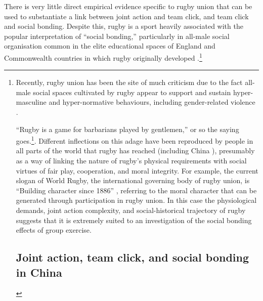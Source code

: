 There is very little direct empirical evidence specific to rugby union that can be used to substantiate a link between joint action and team click, and team click and social bonding.  Despite this, rugby is a sport heavily associated with the popular interpretation of ``social bonding,'' particularly in all-male social organisation common in the elite educational spaces of England and Commonwealth countries in which rugby originally developed \citep{Dunning2005,Richards2007,Collins2008}.\footnote{Recently, rugby union has been the site of much criticism due to the fact all-male social spaces cultivated by rugby appear to support and sustain hyper-masculine and hyper-normative behaviours, including gender-related violence \citep{Cosslett2014}.

``Rugby is a game for barbarians played by gentlemen,'' or so the saying goes.\footnote{The origins of this oft-cited Rugby adage is unclear.  The phrase is supposedly the adopted motto of the British Barbarians Football Club, established in 1890 \citep[34]{Dunning2005}.  The complete phrase reads ``Rugby is a game for barbarians played by gentlemen, football is a game for gentlemen played by barbarians.''  However, official club history cites its original motto as, ‘Rugby Football is a game for gentlemen in all classes, but for no bad sportsman in any class' \citep[vii]{Starmer-Smith1977}.  Some sources attribute the saying to British writer and poet Oscar Wilde (1854-1900) \citep{Fleenor2015}}. Different inflections on this adage have been reproduced by people in all parts of the world that rugby has reached (including China \cite{}), presumably as a way of linking the nature of rugby's physical requirements with social virtues of fair play, cooperation, and moral integrity. For example, the current slogan of World Rugby, the international governing body of rugby union, is ``Building character since 1886'' \citep{WorldRugby2017}, referring to the moral character that can be generated through participation in rugby union.  In this case the physiological demands, joint action complexity, and social-historical trajectory of rugby suggests that it is extremely suited to an investigation of the social bonding effects of group exercise.



  \subsection{Joint action, team click, and social bonding in  China}

}
